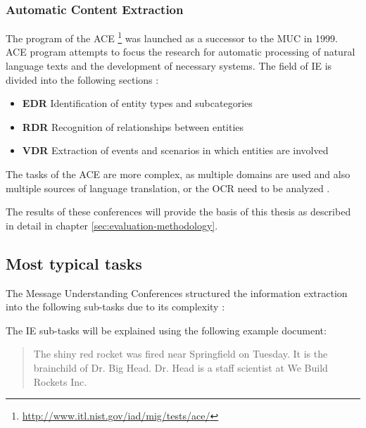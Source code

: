 \subsubsection{Automatic Content Extraction}
The program of the \gls{ACE} \footnote{\url{http://www.itl.nist.gov/iad/mig/tests/ace/}}  was launched as a successor to the \gls{MUC} in 1999. \gls{ACE} program attempts to focus the research for automatic processing of natural language texts and the development of necessary systems. The field of \gls{IE} is divided into the following sections \cite{Nist:2008}\cite{Lavelli:2008}\cite{Turmo:2006}\cite{Linsmayr:2010}:

\begin{itemize}
\item \textbf{\gls{EDR}} \newline
Identification of entity types and subcategories
\item \textbf{\gls{RDR}} \newline
Recognition of relationships between entities
\item \textbf{\gls{VDR}} \newline
Extraction of events and scenarios in which entities are involved
\end{itemize}

The tasks of the \gls{ACE} are more complex, as multiple domains are used and also multiple sources of language translation, or the \gls{OCR} need to be analyzed \cite{Cunningham:2005}.

The results of these conferences will provide the basis of this thesis as described in detail in chapter \ref{sec:evaluation-methodology}.

\subsection{Most typical tasks}

The Message Understanding Conferences structured the information extraction into the following sub-tasks due to its complexity \cite{Carstensen:2010}\cite{Lavelli:2008}:

The \gls{IE} sub-tasks will be explained using the following example document:

\begin{quote}
The shiny red rocket was fired near Springfield on Tuesday. It is the brainchild of Dr. Big Head. Dr. Head is a staff scientist at We Build Rockets Inc.
\cite{Cunningham:2005}
\end{quote}

